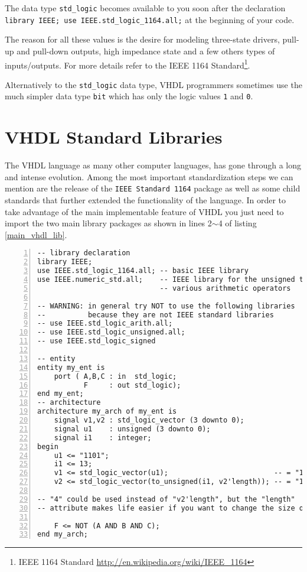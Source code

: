 The data type \texttt{std\_logic} becomes available to you soon after the declaration \texttt{library IEEE; use IEEE.std\_logic\_1164.all;} at the beginning of your code.

The reason for all these values is the desire for modeling three-state drivers, pull-up and pull-down outputs, high impedance state and a few others types of inputs/outputs. For more details refer to the IEEE 1164 Standard\footnote{IEEE 1164 Standard \footnotesize\url{http://en.wikipedia.org/wiki/IEEE_1164}}.

Alternatively to the \texttt{std\_logic} data type, VHDL programmers sometimes use the much simpler data type \texttt{bit} which has only the logic values \texttt{1} and \texttt{0}.

\section{VHDL Standard Libraries}
The VHDL language as many other computer languages, has gone through a long and intense evolution. Among the most important standardization steps we can mention are the release of the \texttt{IEEE Standard 1164} package as well as some child standards that further extended the functionality of the language. In order to take advantage of the main implementable feature of VHDL you just need to import the two main library packages as shown in lines 2$\sim$4 of listing \ref{main_vhdl_lib}.

\noindent
\begin{minipage}{0.99\linewidth}
\begin{lstlisting}[numbers=left,label=main_vhdl_lib, caption=Typical inclusions of IEEE standard libraries.]
-- library declaration
library IEEE;
use IEEE.std_logic_1164.all; -- basic IEEE library
use IEEE.numeric_std.all;    -- IEEE library for the unsigned type and
                             -- various arithmetic operators

-- WARNING: in general try NOT to use the following libraries 
--          because they are not IEEE standard libraries
-- use IEEE.std_logic_arith.all;
-- use IEEE.std_logic_unsigned.all;
-- use IEEE.std_logic_signed

-- entity
entity my_ent is
	port ( A,B,C : in  std_logic;
	       F     : out std_logic);
end my_ent;
-- architecture
architecture my_arch of my_ent is
    signal v1,v2 : std_logic_vector (3 downto 0);
    signal u1    : unsigned (3 downto 0);
    signal i1    : integer;
begin
    u1 <= "1101";
    i1 <= 13;
    v1 <= std_logic_vector(u1);                         -- = "1101"
    v2 <= std_logic_vector(to_unsigned(i1, v2'length)); -- = "1101"

-- "4" could be used instead of "v2'length", but the "length"
-- attribute makes life easier if you want to change the size of v2

	F <= NOT (A AND B AND C);	
end my_arch;
\end{lstlisting}
\end{minipage}

